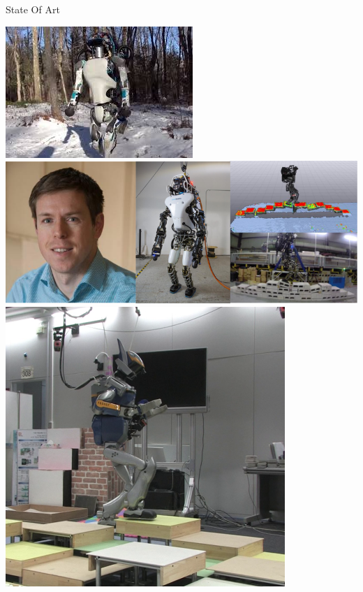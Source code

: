 \begin{frame}{State Of Art}
\begin{center}
\includegraphics[trim={2.0cm 0.0cm 2.0cm 0.0cm}, clip,
height=0.4\textheight ,keepaspectratio]
{figures/stateoftheart/bostondynamics.jpeg}
\hspace*{0.3cm}
\includegraphics[trim={20.0cm 0.0cm 0.0cm 0.0cm}, clip,
height=0.4\textheight , keepaspectratio]
{figures/stateoftheart/humanoids2015.png}
\hspace*{0.3cm}
\includegraphics[trim={1.5cm 0.0cm 1.0cm 0.0cm}, clip,
height=0.4\textheight , keepaspectratio]
{figures/stateoftheart/rsj30_humanoid_navigaion_nishiwaki_aist.png}

\end{center}
\end{frame}
